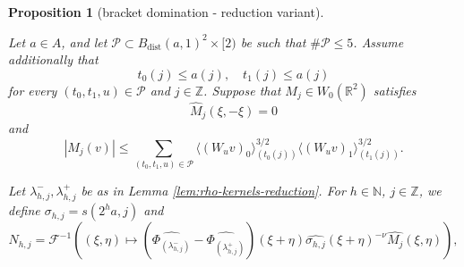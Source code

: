 \documentclass[12pt,reqno]{amsart}
\theoremstyle{plain}
\newtheorem{proposition}[theorem]{Proposition}
\numberwithin{equation}{section}
\theoremstyle{remark}
\newcommand{\uses}[1]{}
\newcommand{\usesdefs}[1]{}
\newcommand{\leanok}{}
\newcommand{\lean}[1]{}
\newcommand{\Z}{{\mathbb Z}}
\newcommand{\N}{{\mathbb N}}
\DeclareMathOperator{\dist}{dist}
\begin{document}
\begin{proposition}[bracket domination - reduction variant]
\label{lem:increase-data-bracket-domination}\uses{lem:rho-kernels-reduction,two bump estimate,bump triangle,orthogonal decay,convolution vector,lem:affine-diagonal-cancellation-reduction,Properties of distance of sequences,Operations on spaced sequences}\usesdefs{gaussian,bracket bump,auto:Wiener-space-definition,auto:convolution-along-vector-definition,multiplicatively spaced monotone sequences,Distance of spaced sequences,closed balls in A,standard bump,geometric parameters,auto:unitary-matrices-definition,square root Gaussian difference}
\lean{Auto.increaseDataBracketDomination}
\leanok
Let \(a\in A\), and let
$
\mathcal P\subset B_{\dist}(a,1)^2\times[2)$ be such that $\#\mathcal P\leq5$. Assume additionally that
\begin{equation}
    \label{E:increase-data-one-sided-scales}
    t_0(j)\leq a(j),
    \quad
    t_1(j)\leq a(j)
\end{equation}
for every \((t_0,t_1,u)\in\mathcal P\) and \(j\in\mathbb Z\).
Suppose that \(M_j\in W_0(\mathbb R^2)\) satisfies
\begin{equation}\label{auto:reduction-diagonal-cancellation}
\widehat M_j(\xi,-\xi)=0
\end{equation}
and
\begin{equation}\label{auto:reduction-kernel-decay}
|M_j(v)|
\leq
\sum_{(t_0,t_1,u)\in\mathcal P}
\langle(W_uv)_0\rangle_{(t_0(j))}^{3/2}
\langle(W_uv)_1\rangle_{(t_1(j))}^{3/2}.
\end{equation}

Let $\lambda_{h,j}^-,\lambda_{h,j}^+$ be as in Lemma \ref{lem:rho-kernels-reduction}.
For $h\in\N$, $j\in \Z$, we define
$
\sigma_{h,j} = s(2^{h} a,j)
$
and
\begin{equation}\label{auto:increase-data-N-kernel}
N_{h,j} =
\mathcal F^{-1}\left((\xi,\eta) \mapsto (\widehat{\Phi_{(\lambda_{h,j}^-)}}-\widehat{\Phi_{(\lambda_{h,j}^+)}})(\xi+\eta) \widehat{\sigma_{h,j}}(\xi+\eta)^{-\nu} \widehat{M_j}(\xi,\eta)\right),
\end{equation}



\end{proposition}
\end{document}
